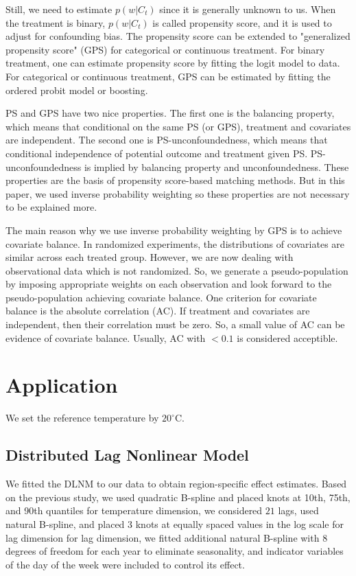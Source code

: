 \documentclass[12pt]{article}
\begin{document}
Still, we need to estimate $p(w\lvert C_t)$ since it is generally unknown to us.
When the treatment is binary, $p(w\lvert C_t)$ is called propensity score,
and it is used to adjust for confounding bias\cite{rosenbaum1983}.
The propensity score can be extended to 
"generalized propensity score" (GPS) for categorical or continuous treatment\cite{imbens2000}.
For binary treatment, one can estimate propensity score by fitting the logit model to data.
For categorical or continuous treatment, GPS can be estimated by fitting the ordered probit model or boosting.

PS and GPS have two nice properties\cite{rosenbaum1983, hirano2004}.
The first one is the balancing property, which means that conditional on the same PS (or GPS),
treatment and covariates are independent.
The second one is PS-unconfoundedness, 
which means that conditional independence of potential outcome and treatment given PS.
PS-unconfoundedness is implied by balancing property and unconfoundedness.
These properties are the basis of propensity score-based matching methods.
But in this paper, 
we used inverse probability weighting so these properties are not necessary to be explained more.

The main reason why we use inverse probability weighting by GPS is to achieve covariate balance.
In randomized experiments, the distributions of covariates are similar across each treated group.
However, we are now dealing with observational data which is not randomized.
So, we generate a pseudo-population by imposing appropriate weights on each observation
and look forward to the pseudo-population achieving covariate balance.
One criterion for covariate balance is the absolute correlation (AC)\cite{gpsboosting2015}.
If treatment and covariates are independent, then their correlation must be zero.
So, a small value of AC can be evidence of covariate balance.
Usually, AC with $ <0.1 $ is considered acceptible.


\section{Application}
\label{section:application}

We set the reference temperature by $20^\circ$C.
\subsection{Distributed Lag Nonlinear Model}

We fitted the DLNM to our data to obtain region-specific effect estimates.
Based on the previous study\cite{gasparrini2015},
we used quadratic B-spline and placed knots at 10th, 75th, and 90th quantiles
for temperature dimension,
we considered $21$ lags, used natural B-spline, 
and placed $3$ knots at equally spaced values in the log scale for lag dimension
for lag dimension,
we fitted additional natural B-spline with $8$ degrees of freedom for each year
to eliminate seasonality,
and indicator variables of the day of the week were included to control its effect.
\end{document}
